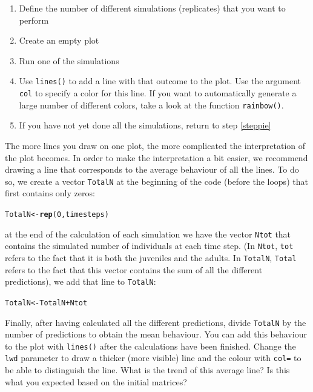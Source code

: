 \documentclass{article}\usepackage[]{graphicx}\usepackage[]{color}
\makeatletter
\newcommand{\hlnum}[1]{\textcolor[rgb]{0.686,0.059,0.569}{#1}}%
\newcommand{\hlopt}[1]{\textcolor[rgb]{0,0,0}{#1}}%
\newcommand{\hlstd}[1]{\textcolor[rgb]{0.345,0.345,0.345}{#1}}%
\newcommand{\hlkwb}[1]{\textcolor[rgb]{0.69,0.353,0.396}{#1}}%
\newcommand{\hlkwd}[1]{\textcolor[rgb]{0.737,0.353,0.396}{\textbf{#1}}}%
\newenvironment{kframe}{%
 \def\at@end@of@kframe{}%
 \ifinner\ifhmode%
  \def\at@end@of@kframe{\end{minipage}}%
  \begin{minipage}{\columnwidth}%
 \fi\fi%
 \def\FrameCommand##1{\hskip\@totalleftmargin \hskip-\fboxsep
 \colorbox{shadecolor}{##1}\hskip-\fboxsep
     \hskip-\linewidth \hskip-\@totalleftmargin \hskip\columnwidth}%
 \MakeFramed {\advance\hsize-\width
   \@totalleftmargin\z@ \linewidth\hsize
   \@setminipage}}%
 {\par\unskip\endMakeFramed%
 \at@end@of@kframe}
\newenvironment{knitrout}{}{} %
\makeatother
\begin{document}
\begin{enumerate}
\item Define the number of different simulations (replicates) that you want to perform
\item Create an empty plot
\item Run one of the simulations\label{steppie}
\item Use \texttt{lines()} to add a line with that outcome to the plot. Use the argument \texttt{col} to specify a color for this line. If you want to automatically generate a large number of different colors, take a look at the function \texttt{rainbow()}.
\item If you have not yet done all the simulations, return to step \ref{steppie}
\end{enumerate}
The more lines you draw on one plot, the more complicated the interpretation of the plot becomes. In order to make the interpretation a bit easier, we recommend drawing a line that corresponds to the average behaviour of all the lines. To do so, we create a vector \texttt{TotalN} at the beginning of the code (before the loops) that first contains only zeros:
\begin{knitrout}
\color{fgcolor}\begin{kframe}
\begin{alltt}
\hlstd{TotalN}\hlkwb{<-}\hlkwd{rep}\hlstd{(}\hlnum{0}\hlstd{,timesteps)}
\end{alltt}
\end{kframe}
\end{knitrout}
at the end of the calculation of each simulation we have the vector \texttt{Ntot} that contains the simulated number of individuals at each time step. (In \texttt{Ntot}, \texttt{tot} refers to the fact that it is both the juveniles and the adults. In \texttt{TotalN}, \texttt{Total} refers to the fact that this vector contains the sum of all the different predictions), we add that line to \texttt{TotalN}:
\begin{knitrout}
\color{fgcolor}\begin{kframe}
\begin{alltt}
\hlstd{TotalN}\hlkwb{<-}\hlstd{TotalN}\hlopt{+}\hlstd{Ntot}
\end{alltt}
\end{kframe}
\end{knitrout}
Finally, after having calculated all the different predictions, divide \texttt{TotalN} by the number of predictions to obtain the mean behaviour. You can add this behaviour to the plot with \texttt{lines()} after the calculations have been finished. Change the \texttt{lwd} parameter to draw a thicker (more visible) line and the colour with \texttt{col=} to be able to distinguish the line. What is the trend of this average line? Is this what you expected based on the initial matrices? 
\end{document}
